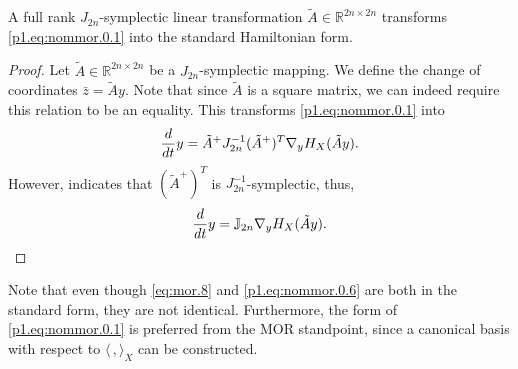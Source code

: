 \begin{lemma} \label{thm:4.2}
A full rank $J_{2n}$-symplectic linear transformation $\tilde A \in \mathbb R^{2n\times 2n}$ transforms \eqref{p1.eq:nommor.0.1} into the standard Hamiltonian form. 
\end{lemma}

\begin{proof}
Let $\tilde A\in \mathbb R^{2n\times 2n}$ be a $J_{2n}$-symplectic mapping. We define the change of coordinates $\bar z = \tilde Ay$. Note that since $\tilde A$ is a square matrix, we can indeed require this relation to be an equality. This transforms \eqref{p1.eq:nommor.0.1} into
\begin{equation} \label{p1.eq:nommor.0.5}
	\edit{ \frac{d}{dt} y = \tilde A^+ J_{2n}^{-1} (\tilde A^+)^T \nabla_y H_X(\tilde Ay).}
\end{equation}
However,  indicates that $(\tilde A^+)^T$ is $J_{2n}^{-1}$-symplectic, thus,
\begin{equation} \label{p1.eq:nommor.0.6}
	\edit{ \frac{d}{dt} y = \mathbb J_{2n} \nabla_y H_X(\tilde Ay).}
\end{equation}
\end{proof}
Note that even though \eqref{eq:mor.8} and \eqref{p1.eq:nommor.0.6} are both in the standard form, they are not identical. Furthermore, the form of \eqref{p1.eq:nommor.0.1} is preferred from the MOR standpoint, since a canonical basis with respect to $\langle\,,\rangle_X$ can be constructed.

